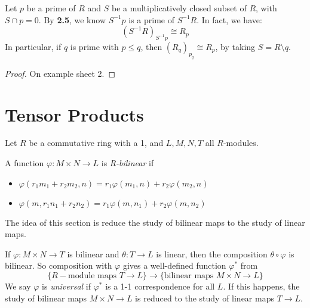 \documentclass[10pt,a4paper]{article}
\begin{document}
\begin{lemma}
  Let $p$ be a prime of $R$ and $S$ be a multiplicatively closed subset of $R$, with $S\cap p = 0$. By \textbf{2.5}, we know $S^{-1}p$ is a prime of $S^{-1}R$. In fact, we have:
  \[(S^{-1}R)_{S^{-1}p} \cong R_p\]
  In particular, if $q$ is prime with $p \leq q$, then $(R_q)_{p_q} \cong R_p$, by taking $S = R\setminus q$.
\end{lemma}
\begin{proof}
  On example sheet 2.
\end{proof}
\section{Tensor Products}
Let $R$ be a commutative ring with a 1, and $L,M,N,T$ all $R$-modules.

\begin{definition}
  A function $\varphi:M \times N \to L$ is \emph{R-bilinear} if
  \begin{itemize}
    \item $\varphi(r_1m_1+r_2m_2, n) = r_1\varphi(m_1, n)+r_2\varphi(m_2, n)$
    \item $\varphi(m, r_1n_1+r_2n_2) = r_1\varphi(m, n_1)+r_2\varphi(m, n_2)$
  \end{itemize}
\end{definition}
The idea of this section is reduce the study of bilinear maps to the study of linear maps.

If $\varphi:M\times N \to T$ is bilinear and $\theta:T \to L$ is linear, then the composition $\theta\circ \varphi$ is bilinear. So composition with $\varphi$ gives a well-defined function $\varphi^{\ast}$ from
\[\{R-\text{module maps }T\to L\} \to \{\text{bilinear maps }M\times N \to L\}\]
We say $\varphi$ is \emph{universal} if $\varphi^\ast$ is a 1-1 correspondence for all $L$. If this happens, the study of bilinear maps $M \times N\to L$ is reduced to the study of linear maps $T \to L$.
\end{document}
